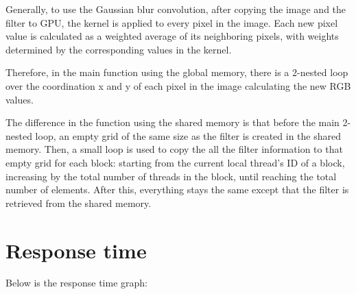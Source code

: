 \documentclass{article}
\begin{document}
Generally, to use the Gaussian blur convolution, after copying the image and the filter to GPU, the kernel is applied to every pixel in the image. Each new pixel value is calculated as a weighted average of its neighboring pixels, with weights determined by the corresponding values in the kernel. 

Therefore, in the main function using the global memory, there is a 2-nested loop over the coordination x and y of each pixel in the image calculating the new RGB values.

The difference in the function using the shared memory is that before the main 2-nested loop, an empty grid of the same size as the filter is created in the shared memory. Then, a small loop is used to copy the all the filter information to that empty grid for each block: starting from the current local thread’s ID of a block, increasing by the total number of threads in the block, until reaching the total number of elements. After this, everything stays the same except that the filter is retrieved from the shared memory.

\section{Response time}

Below is the response time graph:
\end{document}
